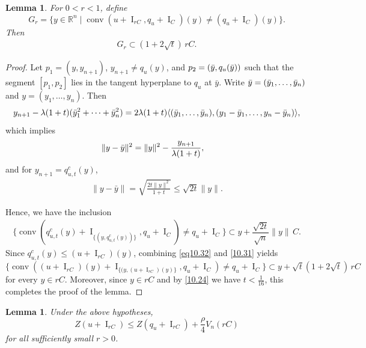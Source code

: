 \documentclass[11pt]{article}
\newtheorem{lema}[teo]{Lemma}
\theoremstyle{definition} %
\DeclareMathOperator{\conv}{conv}
\DeclareMathOperator{\I}{I}
\begin{document}
\begin{lema}\label{claim1}
For $0 < r < 1$, define
$$
G_r = \{ y \in \mathbb{R}^n \mid \conv(u + \I_{rC}, q_u + \I_C)(y) \neq (q_u + \I_C)(y) \}.
$$
Then
\begin{align}\label{eq10.29}
G_r \subset (1 + 2\sqrt{t})\, rC.
\end{align}    
\end{lema}

\begin{proof}
Let $p_1=(y,y_{n+1})$, $y_{n+1}\neq q_u(y)$, and  $p_2= (\Bar{y},q_u(\Bar{y}))$  such that the segment $[p_1,p_2]$ lies in the tangent hyperplane to $q_u$ at $\bar{y}$. Write
$\Bar{y}=(\Bar{y}_1, \dots, \Bar{y}_{n})$ and  $y=(y_1,\dots, y_n)$. Then
\begin{align*}
    y_{n+1}-\lambda(1+t)(\Bar{y}_1^2+\cdots + \Bar{y}_n^2)= 2\lambda(1+t) \langle (\Bar{y}_1, \dots, \Bar{y}_n), (y_1-\Bar{y}_1, \dots, y_n-\Bar{y}_n)\rangle,
\end{align*}
which implies
\begin{align*}
   \|y-\Bar{y}\|^2
    & = \|y\|^2-\frac{y_{n+1}}{\lambda(1+t)},
\end{align*}
and for $y_{n+1}=q_{u,t}^c(y)$,
\begin{align}\label{eq10.32}
 \|y-\bar{y}\| = \sqrt{\frac{2 t\|y\|^2}{1+t}}\le \sqrt{2t}\|y\|.  
\end{align}

Hence, we have the inclusion
\begin{align}\label{10.31}
\bigl\{ \conv(q_{u,t}^c(y)+\I_{\{(y,q_{u,t}^c(y))\}}, q_u+\I_C)\neq q_u+\I_C\bigr\}\subset y+\dfrac{\sqrt{2 t}}{\sqrt{n}}\|y\|\, C.
\end{align}
Since $q_{u,t}^c(y)\leq (u + \I_{rC})(y)$, combining \eqref{eq10.32} and \eqref{10.31} yields
$$\bigl\{\conv((u + \I_{rC})(y)+\I_{\{(y,(u + \I_{rC})(y)\}}, q_u+\I_C)\neq q_u+\I_C\bigl\}\subset 
y+\sqrt{t}(1+2\sqrt{t})\,rC$$
for every $y\in rC$. Moreover, since $y \in  rC$ and by \eqref{10.24} we have $t < \frac{1}{16}$, this completes the proof of the lemma.
\end{proof}



\begin{lema}\label{lema10.1}
Under the above hypotheses,
$$Z(u + \I_{rC})\leq Z(q_u+\I_{rC})+\frac{\rho}{4}V_n(rC)$$
for all sufficiently small $r > 0$.
\end{lema}
\end{document}
